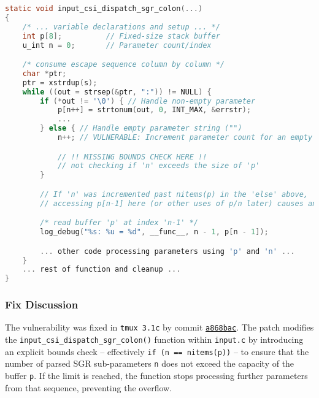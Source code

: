 \documentclass[11pt,a4paper,twocolumn]{article}
\begin{document}
\begin{figure*}[t] 
\centering
	\begin{lstlisting}[language=C, caption=Vulnerable logic simplified: Stack buffer overflow in empty SGR parameter handling, label={lst:vulnerable-sgr-simplified}]
static void input_csi_dispatch_sgr_colon(...)
{
    /* ... variable declarations and setup ... */
    int p[8];          // Fixed-size stack buffer
    u_int n = 0;       // Parameter count/index

    /* consume escape sequence column by column */
    char *ptr;
    ptr = xstrdup(s);
    while ((out = strsep(&ptr, ":")) != NULL) {
        if (*out != '\0') { // Handle non-empty parameter
            p[n++] = strtonum(out, 0, INT_MAX, &errstr);
            ...
        } else { // Handle empty parameter string ("")
            n++; // VULNERABLE: Increment parameter count for an empty parameter

            // !! MISSING BOUNDS CHECK HERE !!
            // not checking if 'n' exceeds the size of 'p'
        }

        // If 'n' was incremented past nitems(p) in the 'else' above,
        // accessing p[n-1] here (or other uses of p/n later) causes an out-of-bounds access.

        /* read buffer 'p' at index 'n-1' */
        log_debug("%s: %u = %d", __func__, n - 1, p[n - 1]);

        ... other code processing parameters using 'p' and 'n' ...
    }
    ... rest of function and cleanup ...
}
\end{lstlisting}
\end{figure*}

\subsubsection*{Fix Discussion}
\label{ssec:fix_cve_2020_27347}

The vulnerability was fixed in \texttt{tmux 3.1c} by commit \href{https://github.com/tmux/tmux/commit/a868bacb46e3c900530bed47a1c6f85b0fbe701c}{\texttt{a868bac}}. The patch modifies the \texttt{input\_csi\_dispatch\_sgr\_colon()} function within \texttt{input.c} by introducing an explicit bounds check -- effectively \texttt{if (n == nitems(p))} -- to ensure that the number of parsed SGR sub-parameters \texttt{n} does not exceed the capacity of the buffer \texttt{p}. If the limit is reached, the function stops processing further parameters from that sequence, preventing the overflow.
\end{document}
